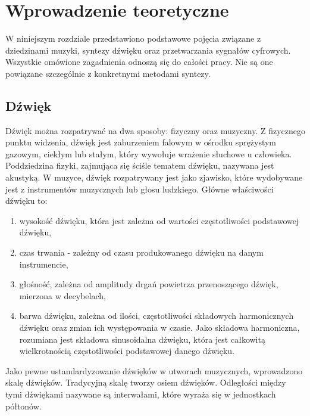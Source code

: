 \chapter{Wprowadzenie teoretyczne}\label{chapter2}

W niniejszym rozdziale przedstawiono podstawowe pojęcia związane z dziedzinami muzyki, syntezy dźwięku oraz przetwarzania sygnałów cyfrowych. Wszystkie omówione zagadnienia odnoszą się do całości pracy. Nie są one powiązane szczególnie z konkretnymi metodami syntezy.
\section{Dźwięk}

Dźwięk można rozpatrywać na dwa sposoby: fizyczny oraz muzyczny. Z fizycznego punktu widzenia, dźwięk jest zaburzeniem falowym w ośrodku sprężystym gazowym, ciekłym lub stałym, który wywołuje wrażenie słuchowe u człowieka. Poddziedzina fizyki, zajmująca się ściśle tematem dźwięku, nazywana jest akustyką. %
W muzyce, dźwięk rozpatrywany jest jako zjawisko, które wydobywane jest z instrumentów muzycznych lub głosu ludzkiego. Główne właściwości dźwięku to:

\begin{enumerate}
	\item wysokość dźwięku, która jest zależna od wartości częstotliwości podstawowej dźwięku,
	
	\item czas trwania - zależny od czasu produkowanego dźwięku na danym instrumencie,
	
	\item głośność, zależna od amplitudy drgań powietrza przenoszącego dźwięk, mierzona w decybelach,
	
	\item barwa dźwięku, zależna od ilości, częstotliwości składowych harmonicznych dźwięku oraz zmian ich występowania w czasie. Jako składowa harmoniczna, rozumiana jest składowa sinusoidalna dźwięku, która jest całkowitą wielkrotnością częstotliwości podstawowej danego dźwięku.
\end{enumerate}

Jako pewne ustandardyzowanie dźwięków w utworach muzycznych, wprowadzono skalę dźwięków. Tradycyjną skalę tworzy osiem dźwięków. Odległości między tymi dźwiękami nazywane są interwałami, które wyraża się w jednostkach półtonów. 

